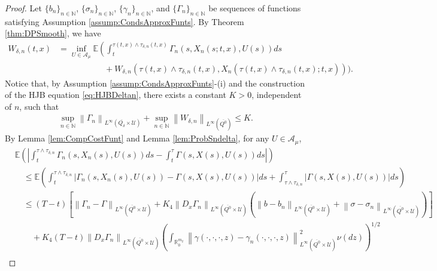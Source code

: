 \documentclass[amscd,amssymb,11pt]{article}
\numberwithin{theorem}{section}
\numberwithin{equation}{section}
\begin{document}
\begin{proof}
Let $\{b_{n}\}_{n\in\mathbb{N}}$, $\{\sigma_{n}\}_{n\in\mathbb{N}}$, $\{\gamma_{n}\}_{n\in\mathbb{N}}$, and $\{\Gamma_{n}\}_{n\in\mathbb{N}}$ be sequences of functions satisfying Assumption \ref{assump:CondsApproxFunts}. By Theorem \ref{thm:DPSmooth}, we have
\begin{align} W_{\delta,n}(t,x)&=\inf_{U\in\mathcal{A}_{\mu}}\mathbb{E}\left(\int_{t}^{\tau(t,x)\wedge\tau_{\delta,n}(t,x)}\Gamma_{n}\left(s,X_{n}(s;t,x),U(s)\right)ds\right.\nonumber\\
\label{eq:DPWdeltan} &\qquad\qquad\quad\,\,\,+W_{\delta,n}\left(\tau(t,x)\wedge\tau_{\delta,n}(t,x),X_{n}(\tau(t,x)\wedge\tau_{\delta,n}(t,x);t,x)\right)\bigg).
\end{align}
Notice that, by Assumption \ref{assump:CondsApproxFunts}-(i) and the construction of the HJB equation \eqref{eq:HJBDeltan}, there exists a constant $K>0$, independent of $n$, such that
\begin{align*}
\sup_{n\in\mathbb{N}}\left\|\Gamma_{n}\right\|_{L^{\infty}(\overline{Q_{\delta}}\times\mathcal{U})}+\sup_{n\in\mathbb{N}}\left\|W_{\delta,n}\right\|_{L^{\infty}(\overline{Q^{0}})}\leq K.
\end{align*}
By Lemma \ref{lem:CompCostFunt} and Lemma \ref{lem:ProbSndelta}, for any $ U\in\mathcal{A}_{\mu}$,
\begin{align*}
&\mathbb{E}\left(\left|\int_{t}^{\tau\wedge\tau_{\delta,n}}\Gamma_{n}\left(s,X_{n}(s),U(s)\right)ds-\int_{t}^{\tau}\Gamma\left(s,X(s),U(s)\right)ds\right|\right)\\
&\quad\leq\mathbb{E}\left(\int_{t}^{\tau\wedge\tau_{\delta,n}}\left|\Gamma_{n}\left(s,X_{n}(s),U(s)\right)-\Gamma\left(s,X(s),U(s)\right)\right|ds+\int_{\tau\wedge\tau_{\delta,n}}^{\tau}\left|\Gamma\left(s,X(s),U(s)\right)\right|ds\right)\\
&\quad\leq (T-t)\left[\left\|\Gamma_{n}-\Gamma\right\|_{L^{\infty}(\overline{Q^{0}}\times\mathcal{U})}+K_{4}\left\|D_{x}\Gamma_{n}\right\|_{L^{\infty}(\overline{Q^{0}}\times\mathcal{U})}\left(\left\|b-b_{n}\right\|_{L^{\infty}(\overline{Q^{0}}\times\mathcal{U})}+\left\|\sigma-\sigma_{n}\right\|_{L^{\infty}(\overline{Q^{0}}\times\mathcal{U})}\right)\right]\\
&\qquad +K_{4}(T-t)\left\|D_{x}\Gamma_{n}\right\|_{L^{\infty}(\overline{Q^{0}}\times\mathcal{U})}\left(\int_{\mathbb{R}^{m_{2}}_{0}}\left\|\gamma(\cdot,\cdot,\cdot,z)-\gamma_n(\cdot,\cdot,\cdot,z)\right\|_{L^{\infty}(\overline{Q^{0}}\times\mathcal{U})}^{2}\nu(dz)\right)^{1/2}\\

\end{align*}
\end{proof}
\end{document}
